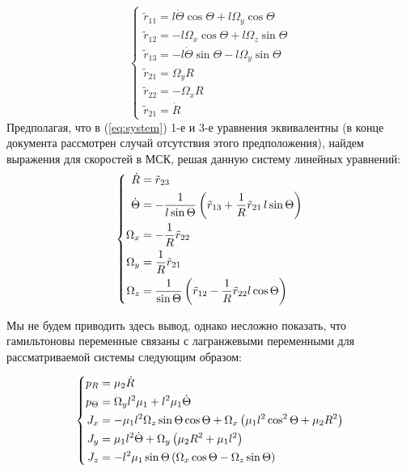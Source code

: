 \begin{equation}
\label{eq:system}
\begin{cases}
\tilde{r}_{11} = l \dot{\Theta} \cos \Theta  + l\Omega_y \cos \Theta \\
\tilde{r}_{12} = -l\Omega_x \cos \Theta + l\Omega_z \sin \Theta \\
\tilde{r}_{13} = -l \dot{\Theta} \sin \Theta - l \Omega_y \sin \Theta \\
\tilde{r}_{21} = \Omega_y R\\
\tilde{r}_{22} = -\Omega_x R\\
\tilde{r}_{21} = \dot R
\end{cases}
\end{equation}
Предполагая, что в (\ref{eq:system}) 1-е и 3-е уравнения эквивалентны (в конце документа рассмотрен случай отсутствия этого предположения), найдем выражения для скоростей в МСК, решая данную систему линейных уравнений:
\begin{gather}
\left\{
\begin{aligned}
\dot R &= \tilde{r}_{23}\\
\dot \Theta &= -\frac{1}{l\sin \Theta} \left( \tilde{r}_{13}+\frac{1}{R} \tilde{r}_{21} \, l \sin\Theta  \right) \\
\Omega_x &= -\frac{1}{R}\tilde{r}_{22} \\
\Omega_y &= \frac{1}{R} \tilde{r}_{21} \\
\Omega_z &= \frac{1}{\sin \Theta} \left( \tilde{r}_{12}- \frac{1}{R} \tilde{r}_{22}l\cos \Theta \right)
\end{aligned}
\right.
\end{gather}

Мы не будем приводить здесь вывод, однако несложно показать, что гамильтоновы переменные связаны с лагранжевыми переменными для рассматриваемой системы следующим образом:

\begin{gather}
\left\{
\begin{aligned}
p_R &= \mu_2\dot R\\
p_{\Theta} &= \Omega_yl^2 \mu_1 + l^2 \mu_1 \dot \Theta \\
J_x &= -\mu_1 l^2 \Omega_z \sin \Theta \cos \Theta + \Omega_x \left( \mu_1 l^2 \cos^2 \Theta + \mu_2 R^2 \right) \\
J_y &= \mu_1 l^2 \dot \Theta + \Omega_y \left( \mu_2 R^2 + \mu_1 l^2 \right) \\
J_z &= -l^2 \mu_1 \sin \Theta \left( \Omega_x \cos\Theta - \Omega_z \sin\Theta \right)
\end{aligned}
\right.
\end{gather}


